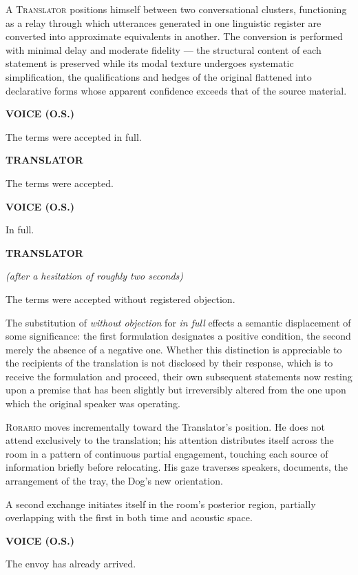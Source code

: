 \documentclass[12pt, oneside]{article}
\newenvironment{action}{%
  \vspace{0.6em}%
  \noindent\ignorespaces%
}{%
  \par\vspace{0.6em}%
}
\newcommand{\character}[1]{%
  \vspace{0.8em}%
  \begin{center}%
    \bfseries\MakeUppercase{#1}%
  \end{center}%
  \vspace{-0.3em}%
}
\newcommand{\paren}[1]{%
  \begin{center}%
    \itshape (#1)%
  \end{center}%
  \vspace{-0.3em}%
}
\newenvironment{dialogue}{%
  \vspace{0.2em}%
  \begin{list}{}{%
    \setlength{\leftmargin}{1.2in}%
    \setlength{\rightmargin}{0.8in}%
    \setlength{\itemsep}{0.6em}%
    \setlength{\parsep}{0pt}%
  }%
}{%
  \end{list}%
  \vspace{0.4em}%
}
\newcommand{\says}[2]{%
  \character{#1}%
  \begin{dialogue}\item #2\end{dialogue}%
}
\newcommand{\saysp}[3]{%
  \character{#1}%
  \paren{#2}%
  \begin{dialogue}\item #3\end{dialogue}%
}
\begin{document}
\begin{action}
A \textsc{Translator} positions himself between two conversational clusters, functioning as a relay through which utterances generated in one linguistic register are converted into approximate equivalents in another. The conversion is performed with minimal delay and moderate fidelity --- the structural content of each statement is preserved while its modal texture undergoes systematic simplification, the qualifications and hedges of the original flattened into declarative forms whose apparent confidence exceeds that of the source material.
\end{action}

\says{Voice (O.S.)}{The terms were accepted in full.}

\says{Translator}{The terms were accepted.}

\says{Voice (O.S.)}{In full.}

\saysp{Translator}{after a hesitation of roughly two seconds}{The terms were accepted without registered objection.}

\begin{action}
The substitution of \textit{without objection} for \textit{in full} effects a semantic displacement of some significance: the first formulation designates a positive condition, the second merely the absence of a negative one. Whether this distinction is appreciable to the recipients of the translation is not disclosed by their response, which is to receive the formulation and proceed, their own subsequent statements now resting upon a premise that has been slightly but irreversibly altered from the one upon which the original speaker was operating.

\textsc{Rorario} moves incrementally toward the Translator's position. He does not attend exclusively to the translation; his attention distributes itself across the room in a pattern of continuous partial engagement, touching each source of information briefly before relocating. His gaze traverses speakers, documents, the arrangement of the tray, the Dog's new orientation.
\end{action}

\begin{action}
A second exchange initiates itself in the room's posterior region, partially overlapping with the first in both time and acoustic space.
\end{action}

\says{Voice (O.S.)}{The envoy has already arrived.}
\end{document}
